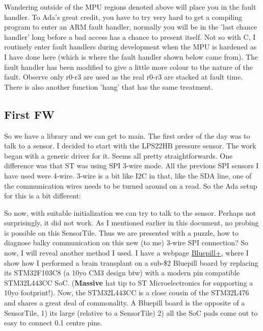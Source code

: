 \documentclass[11pt]{article}
\numberwithin{figure}{section}
\begin{document}
Wandering outside of the MPU regions denoted above will place you in the
fault handler. To Ada's great credit, you have to try very hard to get
a compiling program to enter an ARM fault handler, normally you will
be in the 'last chance handler' long before a bad access has a chance
to present itself. Not so with C, I routinely enter fault handlers
during development when the MPU is hardened as I have done here (which
is where the fault handler shown below came from). The fault handler
has been modified to give a little more colour to the nature of the
fault. Observe only r0-r3 are used as the real r0-r3 are stacked at
fault time. There is also another function 'hang' that has the same
treatment.

{
\selectfont

}

\subsection{First FW}
So we have a library and we can get to main. The first order of the
day was to talk to a sensor. I decided to start with the LPS22HB
pressure sensor. The work began with a generic driver for it. Seems
all pretty straightforwards. One difference was that ST was using SPI
3-wire mode. All the previous SPI sensors I have used were 4-wire. 3-wire
is a bit like I2C in that, like the SDA line, one of the communication
wires needs to be turned around on a read. So the Ada setup for this
is a bit different:

{
\selectfont

}

So now, with suitable initialization we can try to talk to the
sensor. Perhaps not surprisingly, it did not work. As I mentioned
earlier in this document, no probing is possible on this
SensorTile. Thus we are presented with a puzzle, how to diagnose balky
communication on this new (to me) 3-wire SPI connection? So now, I
will reveal another method I used. I have a webpage
\href{http://hrrzi.com/2018/02/the-bluepill.html}{Bluepill+}, where I show how I
performed a brain transplant on a sub-\$2 Bluepill board by
replacing its STM32F103C8 (a 10yo CM3 design btw) with a modern pin
compatible STM32L443CC SoC. (\textbf{Massive} hat tip to ST Microelectronics
for supporting a 10yo footprint!). Now, the STM32L443CC is a close
cousin of the STM32L476 and shares a great deal of commonality. A
Bluepill board is the opposite of a SensorTile, 1) its large (relative
to a SensorTile) 2) all the SoC pads come out to easy to connect
\SI{0.1}{\inchQ} centre pins.
\end{document}
